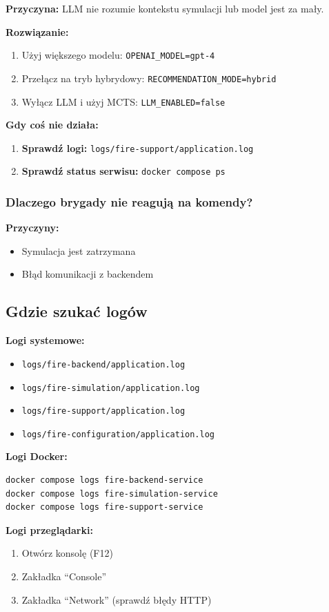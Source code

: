 \textbf{Przyczyna:} LLM nie rozumie kontekstu symulacji lub model jest za mały.

\textbf{Rozwiązanie:}
\begin{enumerate}
    \item Użyj większego modelu: \texttt{OPENAI\_MODEL=gpt-4}
    \item Przełącz na tryb hybrydowy: \texttt{RECOMMENDATION\_MODE=hybrid}
    \item Wyłącz LLM i użyj MCTS: \texttt{LLM\_ENABLED=false}
\end{enumerate}

\textbf{Gdy coś nie działa:}

\begin{enumerate}
    \item \textbf{Sprawdź logi:} \texttt{logs/fire-support/application.log}
    \item \textbf{Sprawdź status serwisu:} \texttt{docker compose ps}
\end{enumerate}

\subsubsection{Dlaczego brygady nie reagują na komendy?}

\textbf{Przyczyny:}
\begin{itemize}
    \item Symulacja jest zatrzymana
    \item Błąd komunikacji z backendem
\end{itemize}

\subsection{Gdzie szukać logów}

\textbf{Logi systemowe:}
\begin{itemize}
    \item \texttt{logs/fire-backend/application.log}
    \item \texttt{logs/fire-simulation/application.log}
    \item \texttt{logs/fire-support/application.log}
    \item \texttt{logs/fire-configuration/application.log}
\end{itemize}

\textbf{Logi Docker:}
\begin{lstlisting}[language=bash, basicstyle=\small]
docker compose logs fire-backend-service
docker compose logs fire-simulation-service
docker compose logs fire-support-service
\end{lstlisting}

\textbf{Logi przeglądarki:}
\begin{enumerate}
    \item Otwórz konsolę (F12)
    \item Zakładka ``Console''
    \item Zakładka ``Network'' (sprawdź błędy HTTP)
\end{enumerate}

